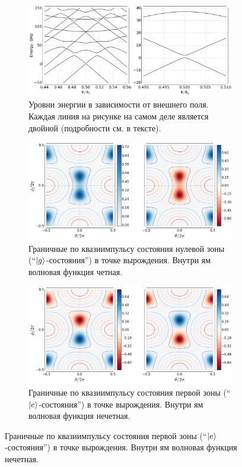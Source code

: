 \documentclass[12pt, twoside]{report}
\DeclarePairedDelimiter\ket{\lvert}{\rangle}
\numberwithin{equation}{section}
\numberwithin{figure}{section}
\begin{document}
\begin{figure}[!p]
\begingroup
\captionsetup[subfigure]{width=\textwidth}
\centering
\begin{subfigure}[t]{0.75\linewidth}
\centering
\includegraphics[width = \textwidth]{Pictures/qubit_levels}
\caption{Уровни энергии в зависимости от внешнего поля. Каждая линия на рисунке на самом деле является двойной (подробности см. в тексте).}
\label{fig:levels}
\end{subfigure}

\begin{subfigure}[t]{0.8\linewidth}
\centering
\includegraphics[width = \textwidth]{Pictures/wfs01}
\caption{Граничные по квазиимпульсу состояния нулевой зоны (``$\ket{g}$-состояния'') в точке вырождения. Внутри ям волновая функция четная.}
\label{fig:wfs01}
\end{subfigure}

\begin{subfigure}[t]{0.8\linewidth}
\centering
\includegraphics[width = \textwidth]{Pictures/wfs23}
\caption{Граничные по квазиимпульсу состояния первой зоны (``$\ket{e}$-состояния'') в точке вырождения. Внутри ям волновая функция нечетная.}
\label{fig:wfs23}
\end{subfigure}


\end{figure}
\end{document}
